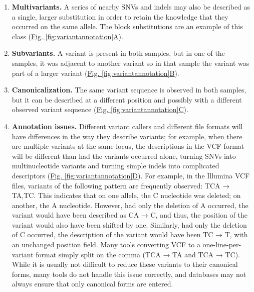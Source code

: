 \begin{enumerate}
\item \textbf {Multivariants.} A series of nearby SNVs and indels may also be described as a single, larger substitution in order to retain the knowledge that they occurred on the same allele. The block substitutions are an example of this class (\hyperref[fig:variantannotation]{Fig. \ref{fig:variantannotation}A}).

\item \textbf{Subvariants.} A variant is present in both samples, but in one of the samples, it was adjacent to another variant so in that sample the variant was part of a larger variant (\hyperref[fig:variantannotation]{Fig. \ref{fig:variantannotation}B}).

\item \textbf{Canonicalization.} The same variant sequence is observed in both samples, but it can be described at a different position and possibly with a different observed variant sequence (\hyperref[fig:variantannotation]{Fig. \ref{fig:variantannotation}C}).

\item \textbf{Annotation issues.} Different variant callers and different file formats will have differences in the way they describe variants; for example, when there are multiple variants at the same locus, the descriptions in the VCF format will be different than had the variants occurred alone, turning SNVs into multinucleotide variants and turning simple indels into complicated descriptors (\hyperref[fig:variantannotation]{Fig. \ref{fig:variantannotation}D}). For example, in the Illumina VCF files, variants of the following pattern are frequently observed: TCA → TA,TC. This indicates that on one allele, the C nucleotide was deleted; on another, the A nucleotide. However, had only the deletion of A occurred, the variant would have been described as CA → C, and thus, the position of the variant would also have been shifted by one. Similarly, had only the deletion of C occurred, the description of the variant would have been TC → T, with an unchanged position field. Many tools converting VCF to a one-line-per-variant format simply split on the comma (TCA → TA and TCA → TC). While it is usually not difficult to reduce these variants to their canonical forms, many tools do not handle this issue correctly, and databases may not always ensure that only canonical forms are entered.
\end{enumerate}

